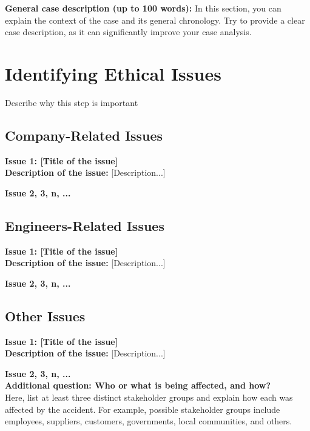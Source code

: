 \documentclass[12pt,a4paper]{article}
\begin{document}
\vspace{0.3cm}
\noindent\textbf{General case description (up to 100 words):} In this section, you can explain the context of the case and its general chronology. Try to provide a clear case description, as it can significantly improve your case analysis.

\vspace{0.5cm}

\section{Identifying Ethical Issues}
\vspace{0.3cm}
\noindent Describe why this step is important 

\subsection{Company-Related Issues}
\noindent\textbf{Issue 1: [Title of the issue]}\\
\textbf{Description of the issue:} [Description...]

\vspace{0.3cm}
\noindent\textbf{Issue 2, 3, n, ...}\\

\subsection{Engineers-Related Issues}
\noindent\textbf{Issue 1: [Title of the issue]}\\
\textbf{Description of the issue:} [Description...]

\vspace{0.3cm}
\noindent\textbf{Issue 2, 3, n, ...}\\

\subsection{Other Issues}
\noindent\textbf{Issue 1: [Title of the issue]}\\
\textbf{Description of the issue:} [Description...]

\vspace{0.3cm}
\noindent\textbf{Issue 2, 3, n, ...}\\

\vspace{0.5cm}
\noindent\textbf{Additional question: Who or what is being affected, and how?}\\
Here, list at least three distinct stakeholder groups and explain how each was affected by the accident. For example, possible stakeholder groups include employees, suppliers, customers, governments, local communities, and others.
\end{document}

